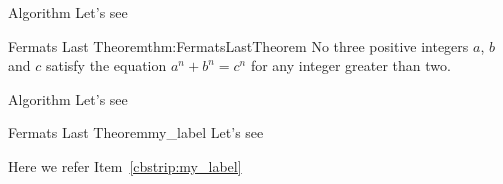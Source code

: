 \documentclass[11pt, letterpaper]{exercise}
\begin{document}



    \begin{problem}{Algorithm}{}
    Let's see
    \end{problem}

    \begin{theoremgreen}{Fermats Last Theorem}{thm:FermatsLastTheorem}
    No three positive integers \(a\), \(b\) and \(c\) satisfy the equation
        \(a^{n} + b^{n} = c^{n}\) for any integer greater than two.
    \end{theoremgreen}

    \begin{cbstrip}{Algorithm}{}
    Let's see
    \end{cbstrip}

    \begin{theoremblue}{Fermats Last Theorem}{my_label}
    Let's see
    \end{theoremblue}
    Here we refer Item~\ref{cbstrip:my_label}%
\end{document}
